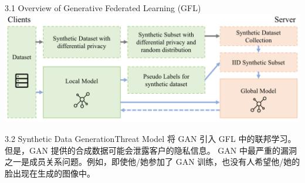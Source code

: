 \documentclass{sintefbeamer}
\theoremstyle{definition}
\begin{document}
\begin{frame}{3.1  Overview of Generative Federated Learning (GFL)}
\centering
\includegraphics[width=1\textwidth]{images/gfl_overview}

\end{frame}

	
\begin{frame}{3.2 Synthetic Data Generation}{Threat Model}
	将 GAN 引入 GFL 中的联邦学习。但是，GAN 提供的合成数据可能会泄露客户的隐私信息。 GAN 中最严重的漏洞之一是成员关系问题。例如，即使他/她参加了 GAN 训练，也没有人希望他/她的脸出现在生成的图像中。
\end{frame}
\end{document}
